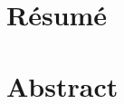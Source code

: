 \chapter*{Résumé}

%
%
{\let\cleardoublepage\relax\newpage
\chapter*{Abstract}}
\begin{otherlanguage}{english}

\end{otherlanguage}